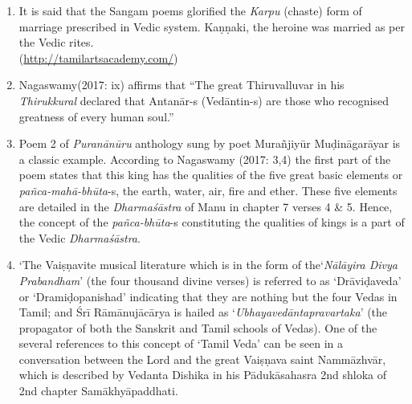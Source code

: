 \begin{enumerate}[{\rm 1.}]
\itemsep=0pt
\item It is said that the Sangam poems glorified the \textit{Karpu }(chaste) form of marriage prescribed in Vedic system. Kaṇṇaki, the heroine was married as per the Vedic rites.\\ (\url{http://tamilartsacademy.com/})

 \item Nagaswamy(2017: ix) affirms that “The great Thiruvalluvar in his \textit{Thirukkural} declared that Antanār-s (Vedāntin-s) are those who recognised greatness of every human soul.”

 \item Poem 2 of \textit{Puranānūru} anthology sung by poet Murañjiyūr Muḍināgarāyar is a classic example. According to Nagaswamy (2017: 3,4) the first part of the poem states that this king has the qualities of the five great basic elements or \textit{pañca-mahā-bhūta}-s, the earth, water, air, fire and ether. These five elements are detailed in the \textit{Dharmaśāstra} of Manu in chapter 7 verses 4 \& 5. Hence, the concept of the \textit{pañca-bhūta}-s constituting the qualities of kings is a part of the Vedic \textit{Dharmaśāstra}.

 \item 
 ‘The Vaiṣṇavite musical literature which is in the form of the\break ‘\textit{Nālāyira Divya Prabandham}’ (the four thousand divine verses) is referred to as ‘Drāviḍaveda’ or ‘Dramiḍopanishad’ indicating that they are nothing but the four Vedas in Tamil; and Śrī Rāmānujācārya is hailed as ‘\textit{Ubhayavedāntapravartaka}’ (the propagator of both the Sanskrit and Tamil schools of Vedas). One of the several references to this concept of ‘Tamil Veda’ can be seen in a conversation between the Lord and the great Vaiṣṇava saint Nammāzhvār, which is described by Vedanta Dishika in his Pādukāsahasra 2nd shloka of 2nd chapter Samākhyāpaddhati.


\end{enumerate}
